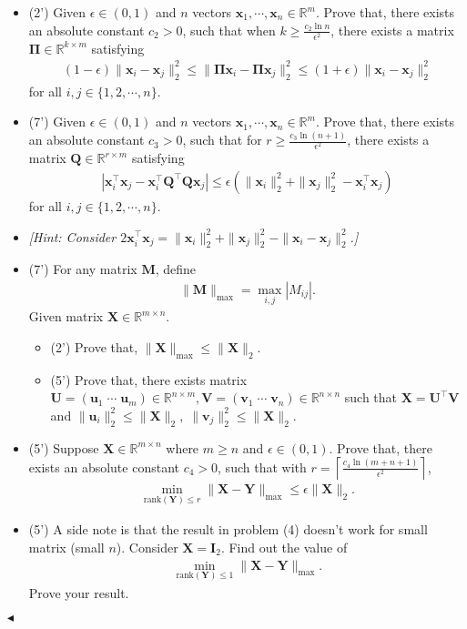 \documentclass[11pt]{article}
\newenvironment{problem}[2][Problem]{\begin{trivlist}
\item[\hskip \labelsep {\bfseries #1}\hskip \labelsep {\bfseries #2.}]}{\hfill$\blacktriangleleft$\end{trivlist}}
\begin{document}
\begin{problem}{3 (26')}
\begin{itemize}
    \item [(1)] (2') Given $\epsilon\in (0,1)$ and $n$ vectors $\bm x_1,\cdots,\bm x_n\in\mathbb{R}^m$. Prove that, there exists an absolute constant $c_2>0$, such that when $k\geq\frac{c_2\ln n}{\epsilon^2}$, there exists a matrix $\bm \Pi\in\mathbb{R}^{k\times m}$ satisfying 
    \begin{align*}
        (1-\epsilon)\|\bm x_i-\bm x_j\|_2^2\leq\|\bm\Pi \bm x_i-\bm \Pi \bm x_j\|_2^2\leq(1+\epsilon)\|\bm x_i-\bm x_j\|_2^2
    \end{align*}
    for all $i,j\in\{1,2,\cdots,n\}$.
    \item [(2)] (7') Given $\epsilon\in(0,1)$ and $n$ vectors $\bm x_1,\cdots,\bm x_n\in\mathbb{R}^m$. Prove that, there exists an absolute constant $c_3>0$, such that for $r\geq\frac{c_3\ln(n+1)}{\epsilon^2}$, there exists a matrix $\bm Q\in\mathbb{R}^{r\times m}$ satisfying 
    \begin{align*}
        |\bm x_i^\top \bm x_j-\bm x_i^\top \bm Q^\top \bm Q \bm x_j|\leq\epsilon(\|\bm x_i\|_2^2+\|\bm x_j\|_2^2-\bm x_i^\top \bm x_j)
    \end{align*} 
    for all $i,j\in\{1,2,\cdots,n\}$.
    \item [] \textit{[Hint: Consider $2\bm x_i^\top \bm x_j=\|\bm x_i\|_2^2+\|\bm x_j\|_2^2-\|\bm x_i-\bm x_j\|_2^2$.]}
    \item [(3)] (7') For any matrix $\bm M$, define 
    \begin{align*}
    \|\bm M\|_{\max}=\max_{i,j}|M_{ij}|.
    \end{align*}
    Given matrix $\bm X\in\mathbb{R}^{m\times n}$.
    \begin{itemize}
        \item [(a)] (2') Prove that, $\|\bm X\|_{\max}\leq \|\bm X\|_2$.
        \item [(b)] (5') Prove that, there exists matrix $\bm U=(\bm u_1\;\cdots\;\bm u_m)\in\mathbb{R}^{n\times m}, \bm V=(\bm v_1\;\cdots\;\bm v_n)\in\mathbb{R}^{n\times n}$ such that $\bm X=\bm U^\top \bm V$ and $\|\bm u_i\|_2^2\leq\|\bm X\|_2,\;\|\bm v_j\|_2^2\leq\|\bm X\|_2$.
    \end{itemize}
    \item [(4)] (5') Suppose $\bm X\in\mathbb{R}^{m\times n}$ where $m\geq n$ and $\epsilon\in(0,1)$. Prove that, there exists an absolute constant $c_4>0$, such that with $r=\left\lceil\frac{c_4\ln(m+n+1)}{\epsilon^2}\right\rceil$, 
    \begin{align*}
        \min_{\mathrm{rank}(\bm Y)\leq r}\|\bm X-\bm Y\|_{\max}\leq\epsilon\|\bm X\|_2.
    \end{align*}
    \item [(5)] (5') A side note is that the result in problem (4) doesn't work for small matrix (small $n$). Consider $\bm X=\bm I_2$. Find out the value of 
    \begin{align*}
        \min_{\mathrm{rank}(\bm Y)\leq 1}\|\bm X-\bm Y\|_{\max}.
    \end{align*} 
    Prove your result.
\end{itemize}
\end{problem}
\end{document}

